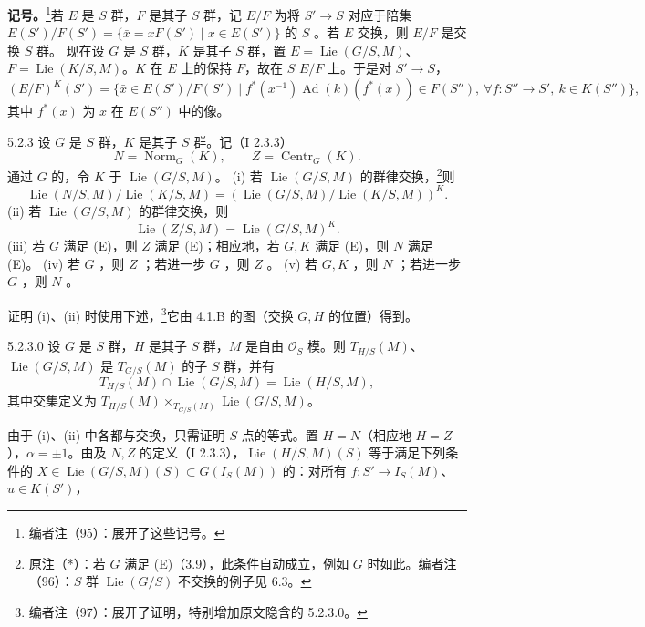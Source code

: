 \textbf{记号。}\footnote{编者注（95）：展开了这些记号。}若 $E$ 是 $S$ 群，$F$ 是其子 $S$ 群，记 $E/F$ 为将 $S'\to S$ 对应于陪集 $E(S')/F(S')=\{\bar x=xF(S')\mid x\in E(S')\}$ 的 $S$ 。若 $E$ 交换，则 $E/F$ 是交换 $S$ 群。
现在设 $G$ 是 $S$ 群，$K$ 是其子 $S$ 群，置 $E=\operatorname{Lie}(G/S,M)$、$F=\operatorname{Lie}(K/S,M)$。$K$ 在 $E$ 上的保持 $F$，故在 $S$  $E/F$ 上。于是对 $S'\to S$，
\[(E/F)^K(S')=\{\bar x\in E(S')/F(S')\mid f^*(x^{-1})\operatorname{Ad}(k)(f^*(x))\in F(S''),\ \forall f:S''\to S',\ k\in K(S'')\},\]
其中 $f^*(x)$ 为 $x$ 在 $E(S'')$ 中的像。
\begin{SGAresult}{}{5.2.3}
设 $G$ 是 $S$ 群，$K$ 是其子 $S$ 群。记（I 2.3.3）
\[N=\operatorname{Norm}_G(K),\qquad Z=\operatorname{Centr}_G(K).\]
通过 $G$ 的，令 $K$ 于 $\operatorname{Lie}(G/S,M)$。
(i) 若 $\operatorname{Lie}(G/S,M)$ 的群律交换，\footnote{原注（*）：若 $G$ 满足 (E)（3.9），此条件自动成立，例如 $G$ 时如此。编者注（96）：$S$ 群 $\operatorname{Lie}(G/S)$ 不交换的例子见 6.3。}则
\[\operatorname{Lie}(N/S,M)/\operatorname{Lie}(K/S,M)=(\operatorname{Lie}(G/S,M)/\operatorname{Lie}(K/S,M))^K.\]
(ii) 若 $\operatorname{Lie}(G/S,M)$ 的群律交换，则
\[\operatorname{Lie}(Z/S,M)=\operatorname{Lie}(G/S,M)^K.\]
(iii) 若 $G$ 满足 (E)，则 $Z$ 满足 (E)；相应地，若 $G,K$ 满足 (E)，则 $N$ 满足 (E)。
(iv) 若 $G$ ，则 $Z$ ；若进一步 $G$ ，则 $Z$ 。
(v) 若 $G,K$ ，则 $N$ ；若进一步 $G$ ，则 $N$ 。
\end{SGAresult}
证明 (i)、(ii) 时使用下述，\footnote{编者注（97）：展开了证明，特别增加原文隐含的 5.2.3.0。}它由 4.1.B 的图（交换 $G,H$ 的位置）得到。
\begin{SGAresult}{}{5.2.3.0}
设 $G$ 是 $S$ 群，$H$ 是其子 $S$ 群，$M$ 是自由 $\mathcal O_S$ 模。则 $T_{H/S}(M)$、$\operatorname{Lie}(G/S,M)$ 是 $T_{G/S}(M)$ 的子 $S$ 群，并有
\[T_{H/S}(M)\cap\operatorname{Lie}(G/S,M)=\operatorname{Lie}(H/S,M),\]
其中交集定义为 $T_{H/S}(M)\times_{T_{G/S}(M)}\operatorname{Lie}(G/S,M)$。
\end{SGAresult}
由于 (i)、(ii) 中各都与交换，只需证明 $S$ 点的等式。置 $H=N$（相应地 $H=Z$），$\alpha=\pm1$。由及 $N,Z$ 的定义（I 2.3.3），$\operatorname{Lie}(H/S,M)(S)$ 等于满足下列条件的 $X\in\operatorname{Lie}(G/S,M)(S)\subset G(I_S(M))$ 的：对所有 $f:S'\to I_S(M)$、$u\in K(S')$，
